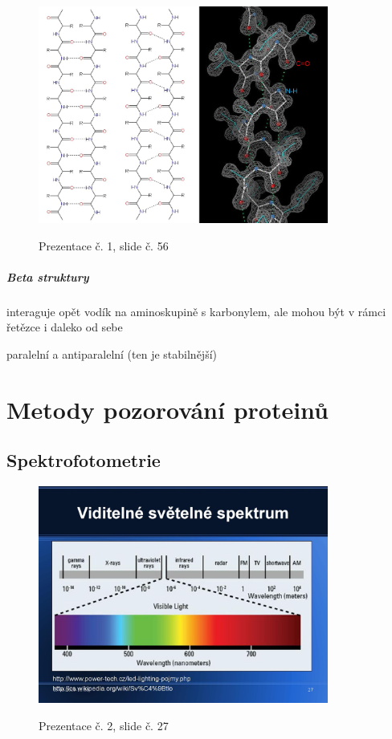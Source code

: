 \documentclass[DIV=8]{scrreprt}
\begin{document}
\begin{figure}
    \caption{Prezentace č. 1, slide č. 56}
    \includegraphics[width=0.85\textwidth]{slides-1/slide-56.jpg}
    \centering
    \label{slides-1-slide-56}
\end{figure}

\paragraph{Beta struktury}
\begin{myItemize}[nosep]
    \item interaguje opět vodík na aminoskupině s karbonylem, ale mohou být v rámci řetězce i daleko od sebe
    \item paralelní a antiparalelní (ten je stabilnější)
\end{myItemize}



\chapter{Metody pozorování proteinů} \label{Metody pozorování proteinů}


\section{Spektrofotometrie} \label{Spektrofotometrie} \FloatBarrier


\begin{figure}
    \caption{Prezentace č. 2, slide č. 27}
    \includegraphics[width=0.85\textwidth]{slides-2/slide-27.jpg}
    \centering
    \label{slides-2-slide-27}
\end{figure}
\end{document}
